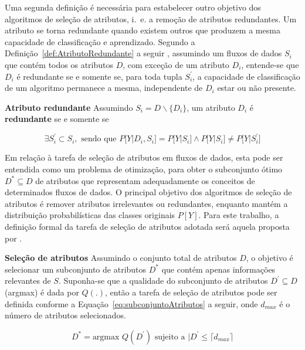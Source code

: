 Uma segunda definição é necessária para 
estabelecer
outro objetivo dos algoritmos de seleção de atributos, 
i.~e.
a remoção de atributos redundantes. Um atributo se torna redundante quando existem outros que produzem a mesma capacidade de classificação e aprendizado. Segundo a Definição~\ref{def:AtributoRedundante} 
a seguir
, assumindo um fluxos de dados $S_i$ que contém todos os atributos $D$, com exceção de um atributo $D_i$, entende-se que $D_i$ é redundante se e somente se, para toda tupla $S_i^{'}$, a capacidade de classificação de um algoritmo permanece a mesma, independente 
de
$D_i$ 
estar
ou não presente.

\begin{definition}{\textbf{Atributo redundante}}\label{def:AtributoRedundante}
Assumindo $S_i = D\backslash \{D_i\}$, um atributo $D_i$ é \textbf{redundante} se e somente se

\begin{equation}
\exists S_i^{'} \subset S_i, \text{ sendo que } P\big[Y \vert D_i, S_i\big] = P\big[Y \vert S_i\big] \wedge P\big[Y \vert S_i\big] \neq P\big[Y \vert S_i^{'}\big]
\end{equation}
\end{definition}




Em relação à tarefa de seleção de atributos em fluxos de dados, 
esta
pode ser entendida como um problema de otimização, para obter o subconjunto ótimo $D^{*} \subseteq D$ de atributos que representam adequadamente os conceitos de determinados fluxos de dados. O principal objetivo dos algoritmos de seleção de atributos é remover atributos irrelevantes ou redundantes, enquanto mantém a distribuição probabilísticas das classes originais $P[Y]$. Para este trabalho, a definição formal da tarefa de seleção de atributos adotada será aquela proposta por \cite{Barddal2017}.

\begin{definition}{\textbf{Seleção de atributos}}\label{def:selecaoAtributos}
Assumindo o conjunto total de atributos $D$, o objetivo é selecionar um subconjunto de atributos $D^{*}$ que contém apenas informações relevantes de $S$. Suponha-se que a qualidade do subconjunto de atributos $D^{'} \subseteq D$ (argmax) é dada por $Q(.)$, então a tarefa de seleção de atributos pode ser definida conforme a Equação~\ref{eq:subconjuntoAtributos} a seguir, onde $d_{max}$ é o número de atributos selecionados.

\begin{equation}\label{eq:subconjuntoAtributos}
D^{*} = \text{argmax } Q(D^{'}) \text{ sujeito a } \vert D^{'} \leq \lceil d_{max}\rceil
\end{equation}
\end{definition}

